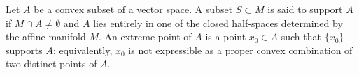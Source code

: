 Let $A$ be a convex subset of a vector space. A subset $S \subset M$ is said to support $A$ if $M \cap A \neq \emptyset$ and $A$ lies entirely in one of the closed half-spaces determined by the affine manifold $M$. An extreme point of $A$ is a point $x_0 \in A$ such that $\{x_0\}$ supports $A$; equivalently, $x_0$ is not expressible as a proper convex combination of two distinct points of $A$.
